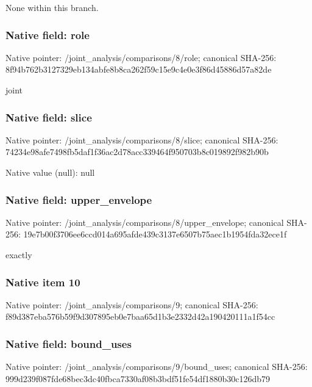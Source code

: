 \documentclass[10pt,a4paper]{article}
\begin{document}
\begingroup\raggedright\sloppy None within this branch.\par\endgroup

\subsubsection{Native field: role}
Native pointer: /joint\_\allowbreak{}analysis/comparisons/8/role; canonical SHA-256: 8f94b762b3127329eb134abfe8b8ca262f59c15e9c4e0e3f86d45886d57a82de

\begingroup\raggedright\sloppy joint\par\endgroup

\subsubsection{Native field: slice}
Native pointer: /joint\_\allowbreak{}analysis/comparisons/8/slice; canonical SHA-256: 74234e98afe7498fb5daf1f36ac2d78acc339464f950703b8c019892f982b90b

Native value (null): null

\subsubsection{Native field: upper\_\allowbreak{}envelope}
Native pointer: /joint\_\allowbreak{}analysis/comparisons/8/upper\_\allowbreak{}envelope; canonical SHA-256: 19e7b00f3706ee6ccd014a695afde439c3137e6507b75aec1b1954fda32ece1f

\begingroup\raggedright{} exactly\par\endgroup

\subsubsection{Native item 10}
Native pointer: /joint\_\allowbreak{}analysis/comparisons/9; canonical SHA-256: f89d387eba576b59f9d307895eb0e7baa65d1b3e2332d42a190420111a1f54cc

\subsubsection{Native field: bound\_\allowbreak{}uses}
Native pointer: /joint\_\allowbreak{}analysis/comparisons/9/bound\_\allowbreak{}uses; canonical SHA-256: 999d239f087fde68bec3dc40fbca7330af08b3bdf51fe54df1880b30c126db79
\end{document}
